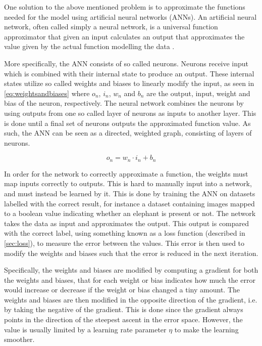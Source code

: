 \documentclass{kththesis}
\begin{document}
One solution to the above mentioned problem is to approximate the functions needed for the model using artificial neural networks (ANNs). An artificial neural network, often called simply a neural network, is a universal function approximator that given an input calculates an output that approximates the value given by the actual function modelling the data \parencite{rojas2013neural}. 

More specifically, the ANN consists of so called neurons. Neurons receive input which is combined with their internal state to produce an output. These internal states utilize so called weights and biases to linearly modify the input, as seen in \autoref{eq:weightsandbiases} where $o_n$, $i_n$, $w_n$ and $b_n$ are the output, input, weight and bias of the neuron, respectively. The neural network combines the neurons by using outputs from one so called layer of neurons as inputs to another layer. This is done until a final set of neurons outputs the approximated function value. As such, the ANN can be seen as a directed, weighted graph, consisting of layers of neurons. \parencite{lecun2015deep} 

\begin{equation}
\label{eq:weightsandbiases}
o_n = w_n \cdot i_n + b_n 
\end{equation}

In order for the network to correctly approximate a function, the weights must map inputs correctly to outputs. This is hard to manually input into a network, and must instead be learned by it. This is done by training the ANN on datasets labelled with the correct result, for instance a dataset containing images mapped to a boolean value indicating whether an elephant is present or not. The network takes the data as input and approximates the output. This output is compared with the correct label, using something known as a loss function (described in \autoref{sec:loss}), to measure the error between the values. This error is then used to modify the weights and biases such that the error is reduced in the next iteration. \parencite{lecun2015deep} 

Specifically, the weights and biases are modified by computing a gradient for both the weights and biases, that for each weight or bias indicates how much the error would increase or decrease if the weight or bias changed a tiny amount. The weights and biases are then modified in the opposite direction of the gradient, i.e. by taking the negative of the gradient. This is done since the gradient always points in the direction of the steepest ascent in the error space. However, the value is usually limited by a learning rate parameter $\eta$ to make the learning smoother. \parencite{lecun2015deep}
\end{document}

